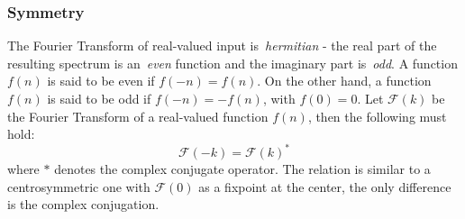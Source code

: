 \subsubsection{Symmetry}
%
The Fourier Transform of real-valued input is~\emph{hermitian} - the real part of the resulting spectrum
is an~\emph{even} function and the imaginary part is~\emph{odd}. A function $f(n)$ is said to be even if
$f(-n) = f(n)$. On the other hand, a function $f(n)$ is said to be odd if $f(-n) = -f(n)$,
with $f(0) = 0$. Let $\mathcal{F}(k)$ be the Fourier Transform of a real-valued function $f(n)$, then
the following must hold:
\begin{equation}
 \mathcal{F}(-k) = \mathcal{F}(k)^*
\end{equation}
where $*$ denotes the complex conjugate operator. The relation is similar to a centrosymmetric one
with $\mathcal{F}(0)$ as a fixpoint at the center, the only difference is the complex conjugation.


